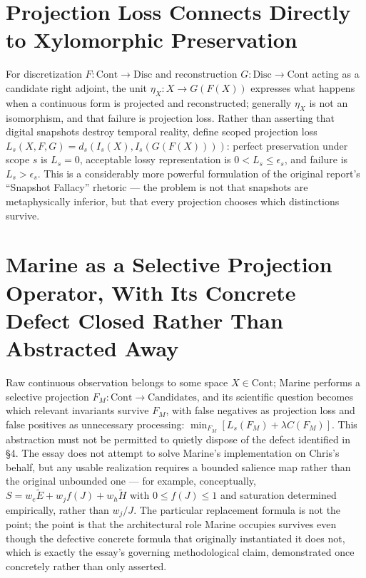 \documentclass[12pt]{article}
\begin{document}
\section{Projection Loss Connects Directly to Xylomorphic Preservation}

For discretization $F:\mathrm{Cont}\to\mathrm{Disc}$ and reconstruction $G:\mathrm{Disc}\to\mathrm{Cont}$ acting as a candidate right adjoint, the unit $\eta_X:X\to G(F(X))$ expresses what happens when a continuous form is projected and reconstructed; generally $\eta_X$ is not an isomorphism, and that failure is projection loss. Rather than asserting that digital snapshots destroy temporal reality, define scoped projection loss $L_s(X,F,G)=d_s(I_s(X),I_s(G(F(X))))$: perfect preservation under scope $s$ is $L_s=0$, acceptable lossy representation is $0<L_s\leq\epsilon_s$, and failure is $L_s>\epsilon_s$. This is a considerably more powerful formulation of the original report's ``Snapshot Fallacy'' rhetoric — the problem is not that snapshots are metaphysically inferior, but that every projection chooses which distinctions survive.

\section{Marine as a Selective Projection Operator, With Its Concrete Defect Closed Rather Than Abstracted Away}

Raw continuous observation belongs to some space $X\in\mathrm{Cont}$; Marine performs a selective projection $F_M:\mathrm{Cont}\to\mathrm{Candidates}$, and its scientific question becomes which relevant invariants survive $F_M$, with false negatives as projection loss and false positives as unnecessary processing: $\min_{F_M}[L_s(F_M)+\lambda C(F_M)]$. This abstraction must not be permitted to quietly dispose of the defect identified in \S4. The essay does not attempt to solve Marine's implementation on Chris's behalf, but any usable realization requires a bounded salience map rather than the original unbounded one — for example, conceptually, $S=w_e\widetilde{E}+w_jf(J)+w_h\widetilde{H}$ with $0\leq f(J)\leq1$ and saturation determined empirically, rather than $w_j/J$. The particular replacement formula is not the point; the point is that the architectural role Marine occupies survives even though the defective concrete formula that originally instantiated it does not, which is exactly the essay's governing methodological claim, demonstrated once concretely rather than only asserted.
\end{document}
